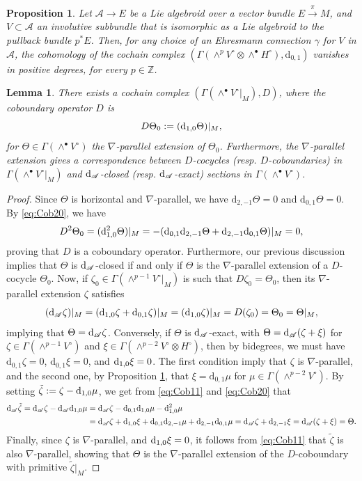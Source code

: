 \documentclass[10pt,a4paper]{amsart}
\newtheorem{proposition}{Proposition}
\newtheorem{lemma}{Lemma}
\newcommand{\A}{\mathscr{A}}
\newcommand{\Z}{\mathbb{Z}}
\renewcommand{\d}{%
  \relax\ifmmode\mathrm{d}\else\oldd\fi
}
\newcommand{\dR}{\mathrm{d}_{2,-1}}
\renewcommand{\dh}{%
  \relax\ifmmode\mathrm{d}_{1,0}\else\olddh\fi
}
\newcommand{\dv}{\mathrm{d}_{0,1}}
\begin{document}
\begin{proposition}\label{vanishprop}
  Let $\A\to E$ be a Lie algebroid over a vector bundle $E\overset{\pi}{\to} M$,
  and $V\subset\A$ an involutive subbundle that is isomorphic as a Lie algebroid to the pullback bundle $p^*E$.
  Then, for any choice of an Ehresmann connection $\gamma$ for $V$ in $\A$, the cohomology of the cochain complex 
  $(\Gamma(\wedge^p V^\circ \otimes \wedge^{\bullet}H^\circ),\dv)$ vanishes in positive degrees, for every $p\in\Z$.
\end{proposition}

\begin{lemma}\label{lemma:CohomD}
  There exists a cochain complex $(\Gamma(\wedge^\bullet V^\circ|_M),D)$, where the coboundary operator $D$ is
  \[
    D\Theta_0 := (\dh\Theta)|_M,
  \]
  for $\Theta\in\Gamma(\wedge^\bullet V^\circ)$ the $\nabla$-parallel extension of $\Theta_0$.
  Furthermore, the $\nabla$-parallel extension gives a correspondence between 
  $D$-cocycles (resp. $D$-coboundaries) in $\Gamma(\wedge^\bullet V^\circ|_M)$ and $\d_\A$-closed (resp. $\d_\A$-exact) sections in $\Gamma(\wedge^\bullet V^\circ)$.
\end{lemma}

\begin{proof}
  Since $\Theta$ is horizontal and $\nabla$-parallel, we have $\dR\Theta=0$ and $\dv\Theta=0$. 
  By \eqref{eq:Cob20}, we have
  \[
    D^2\Theta_0 = (\dh^2\Theta)|_M = -(\dv\dR\Theta + \dR\dv\Theta)|_M = 0,
  \]
  proving that $D$ is a coboundary operator.
  Furthermore, our previous discussion implies that $\Theta$ is $\d_\A$-closed if and only if $\Theta$ is the $\nabla$-parallel extension of a $D$-cocycle $\Theta_0$.
  Now, if $\zeta_0\in\Gamma(\wedge^{p-1}V^\circ|_M)$ is such that $D\zeta_0 = \Theta_0$, then its $\nabla$-parallel extension $\zeta$ satisfies
  \[
    (\d_\A\zeta)|_M = (\dh\zeta + \dv\zeta)|_M = (\dh\zeta)|_M = D(\zeta_0) = \Theta_0 = \Theta|_M,
  \]
  implying that $\Theta=\d_\A\zeta$.
  Conversely, if $\Theta$ is $\d_\A$-exact, with $\Theta = \d_\A(\zeta+\xi)$ for $\zeta\in\Gamma(\wedge^{p-1}V^\circ)$ and $\xi\in\Gamma(\wedge^{p-2}V^\circ\otimes H^\circ)$,
  then by bidegrees, we must have $\dv\zeta=0$, $\dv\xi=0$, and $\dh\xi = 0$.
  The first condition imply that $\zeta$ is $\nabla$-parallel,
  and the second one, by Proposition \ref{vanishprop}, that $\xi=\dv\mu$ for $\mu\in\Gamma(\wedge^{p-2}V^\circ)$.
  By setting $\tilde{\zeta} := \zeta - \dh\mu$, we get from \eqref{eq:Cob11} and \eqref{eq:Cob20} that
  \begin{align*}
    \d_\A\tilde{\zeta} = \d_\A\zeta - \d_\A\dh\mu &= \d_\A\zeta - \dv\dh\mu - \dh^2\mu \\
    &= \d_\A\zeta + \dh\xi + \dv\dR\mu + \dR\dv\mu = \d_\A\zeta + \dR\xi = \d_\A(\zeta+\xi) = \Theta.
  \end{align*}
  Finally, since $\zeta$ is $\nabla$-parallel, and $\dh\xi=0$, it follows from \eqref{eq:Cob11} that $\tilde{\zeta}$ is also $\nabla$-parallel,
  showing that $\Theta$ is the $\nabla$-parallel extension of the $D$-coboundary with primitive $\tilde{\zeta}|_M$.
\end{proof}
\end{document}
